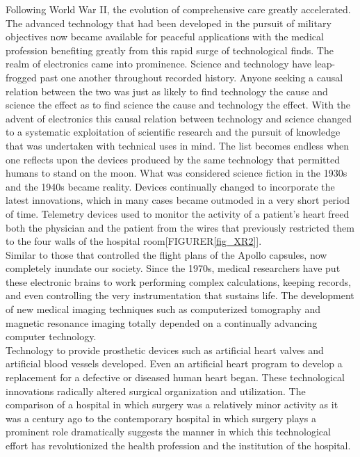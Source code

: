 \documentclass[12pt]{article}
\begin{document}
Following World War II, the evolution of comprehensive care greatly accelerated.
The advanced technology that had been developed in the pursuit of military objectives now became available for peaceful applications with the medical profession benefiting greatly from this rapid surge of technological finds.
The realm of electronics came into prominence.
Science and technology have leap-frogged past one another throughout recorded history.
Anyone seeking a causal relation between the two was just as likely to find technology the cause and science the effect as to find science the cause and technology the effect.
With the advent of electronics this causal relation between technology and science changed to a systematic exploitation of scientific research and the pursuit of knowledge that was undertaken with technical uses in mind.
The list becomes endless when one reflects upon the devices produced by the same technology that permitted humans to stand on the moon.
What was considered science fiction in the 1930s and the 1940s became reality.
Devices continually changed to incorporate the latest innovations, which in many cases became outmoded in a very short period of time.
Telemetry devices used to monitor the activity of a patient's heart freed both the physician and the patient from the wires that previously restricted them to the four walls of the hospital room[FIGURER\ref{fig_XR2}].\\


Similar to those that controlled the flight plans of the Apollo capsules, now completely inundate our society.
Since the 1970s, medical researchers have put these electronic brains to work performing complex calculations, keeping records, and even controlling the very instrumentation that sustains life.
The development of new medical imaging techniques such as computerized tomography and magnetic resonance imaging totally depended on a continually advancing computer technology.\\

Technology to provide prosthetic devices such as artificial heart valves and artificial blood vessels developed.
Even an artificial heart program to develop a replacement for a defective or diseased human heart began.
These technological innovations radically altered surgical organization and utilization.
The comparison of a hospital in which surgery was a relatively minor activity as it was a century ago to the contemporary hospital in which surgery plays a prominent role dramatically suggests the manner in which this technological effort has revolutionized the health profession and the institution of the hospital.\\
\end{document}
